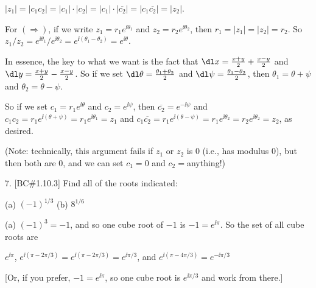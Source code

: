 \item{} $|z_1|=|c_1c_2|=|c_1|\cdot|c_2|=|c_1|\cdot|\overline{c_2}|=|c_1\overline{c_2}|=|z_2|$.

\msk

\item{} For $(\Rightarrow)$, if we write $z_1=r_1e^{\ii\theta_1}$ and $z_2=r_2e^{\ii\theta_2}$, then 
$r_1=|z_1|=|z_2|=r_2$. So $z_1/z_2=e^{\ii\theta_1}/e^{\ii\theta_2}=e^{\ii(\theta_1-\theta_2)}
=e^{\ii\theta}$. 

\msk

\item{} In essence, the key to what we want is the fact that $\dl x= {{x+y}\over{2}}+{{x-y}\over{2}}$ and
$\dl y= {{x+y}\over{2}}-{{x-y}\over{2}}$. So if we set $\dl\theta={{\theta_1+\theta_2}\over{2}}$
and $\dl\psi={{\theta_1-\theta_2}\over{2}}$, then $\theta_1=\theta+\psi$ and $\theta_2=\theta-\psi$.

\msk

\item{} So if we set $c_1=r_1e^{\ii\theta}$ and $c_2=e^{\ii\psi}$, then $\overline{c_2}=e^{-\ii\psi}$
and $c_1c_2=r_1e^{\ii(\theta+\psi)}=r_1e^{\ii\theta_1}=z_1$ and 
$c_1\overline{c_2}=r_1e^{\ii(\theta-\psi)}=r_1e^{\ii\theta_2}=r_2e^{\ii\theta_2}=z_2$, as desired.

\msk

\item{} (Note: technically, this argument fails if $z_1$ or $z_2$ is 0 (i.e., has modulus 0), but then both are
0, and we can set $c_1=0$ and $c_2=$anything!)

\bsk

\item{7.} [BC\#1.10.3] Find all of the roots indicated:

\msk

\item{} (a) $(-1)^{1/3}$ \hskip1in (b) $8^{1/6}$

\msk

\item{(a)} $(-1)^3=-1$, and so one cube root of $-1$ is $-1=e^{\ii\pi}$. So the set of all
cube roots are

\ssk

\item{} $e^{\ii\pi}$, $e^{\ii(\pi-2\pi/3)}=e^{\ii(\pi-2\pi/3)}=e^{\ii\pi/3}$, and $e^{\ii(\pi-4\pi/3)}=e^{-\ii\pi/3}$

\ssk

\item{} [Or, if you prefer, $-1=e^{\ii\pi}$, so one cube root is $e^{\ii\pi/3}$ and work from there.]

